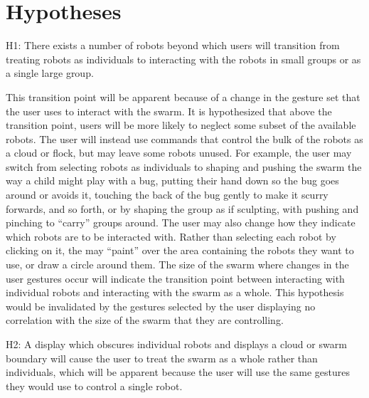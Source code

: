 \section{Hypotheses}

H1: There exists a number of robots beyond which users will transition from treating robots as individuals to interacting with the robots in small groups or as a single large group. 

This transition point will be apparent because of a change in the gesture set that the user uses to interact with the swarm. 
It is hypothesized that above the transition point, users will be more likely to neglect some subset of the available robots. 
The user will instead use commands that control the bulk of the robots as a cloud or flock, but may leave some robots unused. 
For example, the user may switch from selecting robots as individuals to shaping and pushing the swarm the way a child might play with a bug, putting their hand down so the bug goes around or avoids it, touching the back of the bug gently to make it scurry forwards, and so forth, or by shaping the group as if sculpting, with pushing and pinching to ``carry'' groups around. 
The user may also change how they indicate which robots are to be interacted with. 
Rather than selecting each robot by clicking on it, the may ``paint'' over the area containing the robots they want to use, or draw a circle around them. 
The size of the swarm where changes in the user gestures occur will indicate the transition point between interacting with individual robots and interacting with the swarm as a whole. 
This hypothesis would be invalidated by the gestures selected by the user displaying no correlation with the size of the swarm that they are controlling. 

H2: A display which obscures individual robots and displays a cloud or swarm boundary will cause the user to treat the swarm as a whole rather than individuals, which will be apparent because the user will use the same gestures they would use to control a single robot. 

